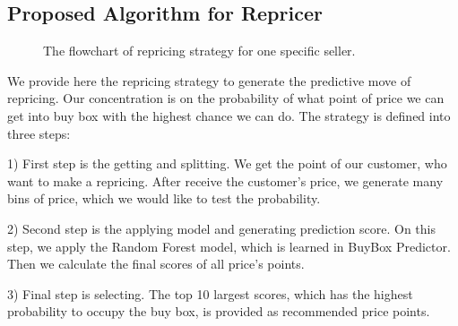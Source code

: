\subsection{Proposed Algorithm for Repricer}
\label{sec:repricermodel}


\begin{figure}[!h]
	\begin{center}
	\end{center}
	\caption{\label{fig:repricerflow}The flowchart of repricing strategy for one specific seller.
	}
\end{figure}

We provide here the repricing strategy to generate the predictive move of repricing. Our concentration is on the probability of what point of price we can get into buy box with the highest chance we can do. The strategy is defined into three steps:

1) First step is the getting and splitting. We get the point of our customer, who want to make a repricing.
After receive the customer's price, we generate many bins of price, which we would like to test the probability. 

2) Second step is the applying model and generating prediction score. On this step, we apply the Random Forest model, which is learned in BuyBox Predictor. Then we calculate the final scores of all price's points.

3) Final step is selecting. The top 10 largest scores, which has the highest probability to occupy the buy box, is provided as recommended price points. 

